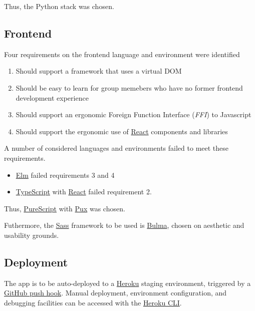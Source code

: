 \documentclass[8pt,a4paper]{report}
\begin{document}
Thus, the Python stack was chosen.

\subsection{Frontend}


Four requirements on the frontend language and environment were identified

\begin{enumerate}
    \item Should support a framework that uses a virtual DOM
    \item Should be easy to learn for group memebers who have no former frontend development experience
    \item Should support an ergonomic Foreign Function Interface (\textit{FFI}) to Javascript
    \item Should support the ergonomic use of \href{https://facebook.github.io/react/}{React} components and libraries
\end{enumerate}


A number of considered languages and environments failed to meet these requirements.


\begin{itemize}
    \item \href{http://elm-lang.org/}{Elm} failed requirements 3 and 4
    \item \href{https://www.typescriptlang.org/}{TypeScript} with \href{https://facebook.github.io/react/}{React} failed requirement 2.
\end{itemize}

Thus, \href{http://www.purescript.org/}{PureScript} with \href{http://www.purescript-pux.org/}{Pux} was chosen.

Futhermore, the \href{https://sass-lang.com/}{Sass} framework to be used is \href{http://bulma.io/}{Bulma}, chosen on aesthetic and usability grounds.


\subsection{Deployment}

The app is to be auto-deployed to a \href{https://www.heroku.com/}{Heroku} staging environment, triggered by a \href{https://devcenter.heroku.com/articles/github-integration}{GitHub push hook}. Manual deployment, environment configuration, and debugging facilities can be accessed with the \href{https://devcenter.heroku.com/articles/heroku-cli}{Heroku CLI}.
\end{document}
